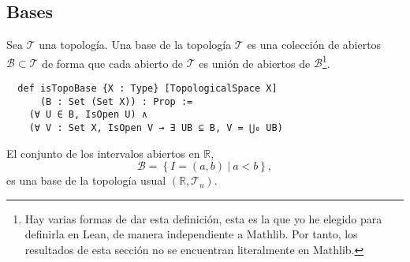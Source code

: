 \subsection{Bases}

\begin{definition}
  Sea $\mathcal{T}$ una topología. Una \textnormal{base de la topología} $\mathcal{T}$ es una colección de abiertos $\mathcal{B} \subset \mathcal{T}$ de forma que cada abierto de $\mathcal{T}$ es unión de abiertos de $\mathcal{B}$\footnote{Hay varias formas de dar esta definición, esta es la que yo he elegido para definirla en Lean, de manera independiente a Mathlib. Por tanto, los resultados de esta sección no se encuentran literalmente en Mathlib.}.
\end{definition}

\begin{lstlisting}
  def isTopoBase {X : Type} [TopologicalSpace X]
      (B : Set (Set X)) : Prop :=
    (∀ U ∈ B, IsOpen U) ∧
    (∀ V : Set X, IsOpen V → ∃ UB ⊆ B, V = ⋃₀ UB)
\end{lstlisting}

\begin{example}
  El conjunto de los intervalos abiertos en $\mathbb{R}$,
  $$
  \mathcal{B} = \left\{ I = (a, b) ~|~ a < b\right\},
  $$
  es una base de la topología usual $(\mathbb{R}, \mathcal{T}_u)$.
\end{example}


